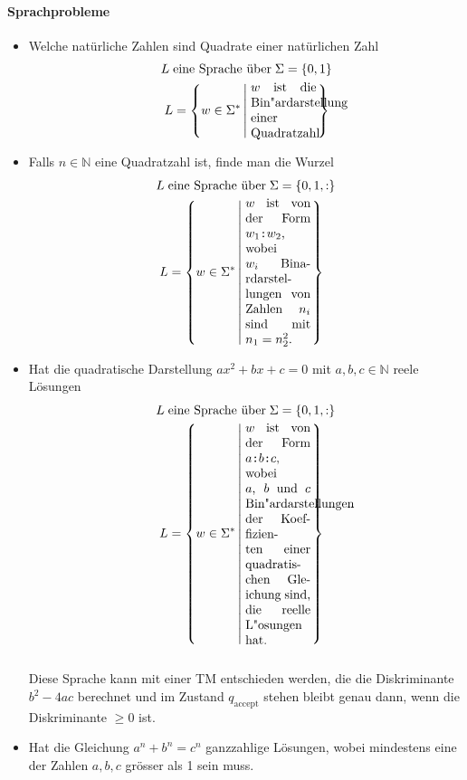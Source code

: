 \paragraph{Sprachprobleme}
\begin{itemize}
    \item Welche natürliche Zahlen sind Quadrate einer natürlichen Zahl \\
    \begin{align*}
        L\; & \text{eine Sprache über} \; \Sigma = \{0,1\} \\
        L &= \left\{ w \in \Sigma^* \left|\; 
        \begin{minipage}{0.15\textwidth}
            $w$ ist die Bin"ardarstellung einer Quadratzahl
        \end{minipage} \right. \right\} 
    \end{align*}
    \item Falls $n \in \mathbb{N}$ eine Quadratzahl ist, finde man die Wurzel
    \begin{align*}
                L\; & \text{eine Sprache über} \; \Sigma = \{0,1,:\} \\
        L &= \left\{ w \in \Sigma^* \left|\; 
        \begin{minipage}{0.15\textwidth}
            $w$ ist von der Form $w_1\texttt{:}w_2$, wobei $w_i$ Binardarstellungen von Zahlen $n_i$ sind mit $n_1=n_2^2$.
        \end{minipage} \right. \right\} 
    \end{align*}
    \item Hat die quadratische Darstellung $ax^2 +bx + c = 0$ mit $a,b,c \in \mathbb{N}$ reele Lösungen
        \begin{align*}
                L\; & \text{eine Sprache über} \; \Sigma = \{0,1,:\} \\
        L &= \left\{ w \in \Sigma^* \left|\; 
        \begin{minipage}{0.15\textwidth}
        $w$ ist von der Form $a\texttt{:}b\texttt{:}c$, wobei $a$, $b$ und $c$ Bin"ardarstellungen der Koeffizienten einer quadratischen Gleichung sind, die reelle L"osungen hat.
        \end{minipage} \right. \right\} 
    \end{align*} \\
    Diese Sprache kann mit einer TM entschieden werden, die die Diskriminante $b^2-4ac$ berechnet und im Zustand $q_{\text{accept}}$ stehen bleibt genau dann, wenn die Diskriminante $\ge 0$ ist.
    \item Hat die Gleichung $a^n + b^n = c^n$ ganzzahlige Lösungen, wobei mindestens eine der Zahlen $a,b,c$ grösser als 1 sein muss.

\end{itemize}
